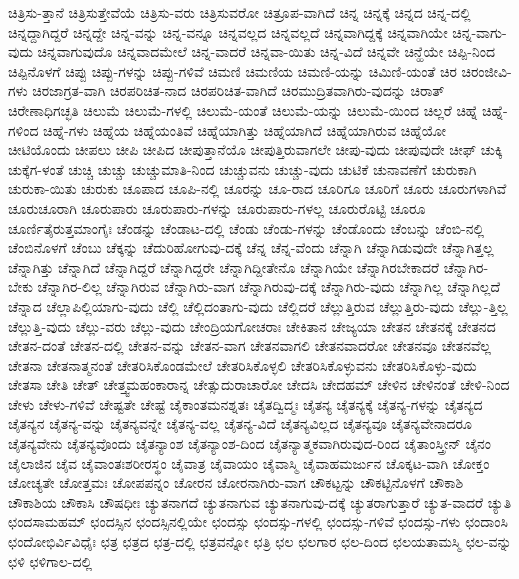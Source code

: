 {ಚಿತ್ರಿಸು-ತ್ತಾನೆ
ಚಿತ್ರಿಸುತ್ತೇವೆಯೆ
ಚಿತ್ರಿಸು-ವರು
ಚಿತ್ರಿಸುವರೋ
ಚಿತ್ರೂಪ-ವಾಗಿದೆ
ಚಿನ್ನ
ಚಿನ್ನಕ್ಕೆ
ಚಿನ್ನದ
ಚಿನ್ನ-ದಲ್ಲಿ
ಚಿನ್ನದ್ದಾಗಿದ್ದರೆ
ಚಿನ್ನದ್ದೇ
ಚಿನ್ನ-ವನ್ನು
ಚಿನ್ನ-ವನ್ನೂ
ಚಿನ್ನವಲ್ಲದ
ಚಿನ್ನವಲ್ಲದೆ
ಚಿನ್ನವಾಗಿದ್ದಕ್ಕೆ
ಚಿನ್ನವಾಗಿಯೇ
ಚಿನ್ನ-ವಾಗು-ವುದು
ಚಿನ್ನವಾಗುವುದೊ
ಚಿನ್ನವಾದಮೇಲೆ
ಚಿನ್ನ-ವಾದರೆ
ಚಿನ್ನವಾ-ಯಿತು
ಚಿನ್ನ-ವಿದೆ
ಚಿನ್ನವೇ
ಚಿನ್ಹೆಯೇ
ಚಿಪ್ಪಿ-ನಿಂದ
ಚಿಪ್ಪಿನೊಳಗೆ
ಚಿಪ್ಪು
ಚಿಪ್ಪು-ಗಳನ್ನು
ಚಿಪ್ಪು-ಗಳಿವೆ
ಚಿಮಣಿ
ಚಿಮಣಿಯ
ಚಿಮಣಿ-ಯನ್ನು
ಚಿಮಿಣಿ-ಯಂತೆ
ಚಿರ
ಚಿರಂಜೀವಿ-ಗಳು
ಚಿರಜಾಗ್ರತ-ವಾಗಿ
ಚಿರಪರಿಚಿತ-ನಾದ
ಚಿರಪರಿಚಿತ-ವಾಗಿದೆ
ಚಿರಮುದ್ರಿತವಾಗಿರು-ವುದನ್ನು
ಚಿರಾತ್
ಚಿರೇಣಾಧಿಗಚ್ಛತಿ
ಚಿಲುಮೆ
ಚಿಲುಮೆ-ಗಳಲ್ಲಿ
ಚಿಲುಮೆ-ಯಂತೆ
ಚಿಲುಮೆ-ಯನ್ನು
ಚಿಲುಮೆ-ಯಿಂದ
ಚಿಲ್ಲರೆ
ಚಿಹ್ನೆ
ಚಿಹ್ನೆ-ಗಳಿಂದ
ಚಿಹ್ನೆ-ಗಳು
ಚಿಹ್ನೆಯ
ಚಿಹ್ನೆಯಂತಿವೆ
ಚಿಹ್ನೆಯಾಗಿತ್ತು
ಚಿಹ್ನೆಯಾಗಿದೆ
ಚಿಹ್ನೆಯಾಗಿರುವ
ಚಿಹ್ನೆಯೋ
ಚೀಟಿಯೊಂದು
ಚೀಪಲು
ಚೀಪಿ
ಚೀಪಿದ
ಚೀಪುತ್ತಾನೆಯೊ
ಚೀಪುತ್ತಿರುವಾಗಲೇ
ಚೀಪು-ವುದು
ಚೀಪುವುದೇ
ಚೀಫ್
ಚುಕ್ಕಿ
ಚುಕ್ಕೆಗ-ಳಂತೆ
ಚುಚ್ಚಿ
ಚುಚ್ಚು
ಚುಚ್ಚುಮಾತಿ-ನಿಂದ
ಚುಚ್ಚುವನು
ಚುಚ್ಚು-ವುದು
ಚುಟಿಕೆ
ಚುನಾವಣೆಗೆ
ಚುರುಕಾಗಿ
ಚುರುಕಾ-ಯಿತು
ಚುರುಕು
ಚೂಪಾದ
ಚೂಪಿ-ನಲ್ಲಿ
ಚೂರನ್ನು
ಚೂ-ರಾದ
ಚೂರಿಗೂ
ಚೂರಿಗೆ
ಚೂರು
ಚೂರುಗಳಾಗಿವೆ
ಚೂರುಚೂರಾಗಿ
ಚೂರುಪಾರು
ಚೂರುಪಾರು-ಗಳನ್ನು
ಚೂರುಪಾರು-ಗಳಲ್ಲ
ಚೂರುರೊಟ್ಟಿ
ಚೂರೂ
ಚೂರ್ಣಿತೈರುತ್ತಮಾಂಗೈಃ
ಚೆಂಡನ್ನು
ಚೆಂಡಾಟ-ದಲ್ಲಿ
ಚೆಂಡು
ಚೆಂಡು-ಗಳನ್ನು
ಚೆಂಡೊಂದು
ಚೆಂಬನ್ನು
ಚೆಂಬಿ-ನಲ್ಲಿ
ಚೆಂಬಿನೊಳಗೆ
ಚೆಂಬು
ಚೆಕ್ಕನ್ನು
ಚೆದುರಿಹೋಗುವು-ದಕ್ಕೆ
ಚೆನ್ನ
ಚೆನ್ನ-ವೆಂದು
ಚೆನ್ನಾಗಿ
ಚೆನ್ನಾಗಿಡುವುದೇ
ಚೆನ್ನಾಗಿತ್ತಲ್ಲ
ಚೆನ್ನಾಗಿತ್ತು
ಚೆನ್ನಾಗಿದೆ
ಚೆನ್ನಾಗಿದ್ದರೆ
ಚೆನ್ನಾಗಿದ್ದರೇ
ಚೆನ್ನಾಗಿದ್ದೀತೇನೊ
ಚೆನ್ನಾಗಿಯೇ
ಚೆನ್ನಾಗಿರಬೇಕಾದರೆ
ಚೆನ್ನಾಗಿರ-ಬೇಕು
ಚೆನ್ನಾಗಿರ-ಲಿಲ್ಲ
ಚೆನ್ನಾಗಿರುವ
ಚೆನ್ನಾಗಿರು-ವಾಗ
ಚೆನ್ನಾಗಿರುವು-ದಕ್ಕೆ
ಚೆನ್ನಾಗಿರು-ವುದು
ಚೆನ್ನಾಗಿಲ್ಲ
ಚೆನ್ನಾಗಿಲ್ಲದೆ
ಚೆನ್ನಾದ
ಚೆಲ್ಲಾಪಿಲ್ಲಿಯಾಗು-ವುದು
ಚೆಲ್ಲಿ
ಚೆಲ್ಲಿದಂತಾಗು-ವುದು
ಚೆಲ್ಲಿದರೆ
ಚೆಲ್ಲುತ್ತಿರುವ
ಚೆಲ್ಲುತ್ತಿರು-ವುದು
ಚೆಲ್ಲು-ತ್ತಿಲ್ಲ
ಚೆಲ್ಲುತ್ತಿ-ವುದು
ಚೆಲ್ಲು-ವರು
ಚೆಲ್ಲು-ವುದು
ಚೇಂದ್ರಿಯಗೋಚರಾಃ
ಚೇಕಿತಾನ
ಚೇಜ್ಯಯಾ
ಚೇತನ
ಚೇತನಕ್ಕೆ
ಚೇತನದ
ಚೇತನ-ದಂತೆ
ಚೇತನ-ದಲ್ಲಿ
ಚೇತನ-ವನ್ನು
ಚೇತನ-ವಾಗ
ಚೇತನವಾಗಲಿ
ಚೇತನವಾದರೋ
ಚೇತನವೂ
ಚೇತನವೆಲ್ಲ
ಚೇತನಾ
ಚೇತನಾತ್ಮನಂತೆ
ಚೇತರಿಸಿಕೊಂಡಮೇಲೆ
ಚೇತರಿಸಿಕೊಳ್ಳಲಿ
ಚೇತರಿಸಿಕೊಳ್ಳುವನು
ಚೇತರಿಸಿಕೊಳ್ಳು-ವುದು
ಚೇತಸಾ
ಚೇತಿ
ಚೇತ್
ಚೇತ್ತ್ವಮಹಂಕಾರಾನ್ನ
ಚೇತ್ಸುದುರಾಚಾರೋ
ಚೇದಸಿ
ಚೇದಹಮ್
ಚೇಳಿನ
ಚೇಳಿನಂತೆ
ಚೇಳಿ-ನಿಂದ
ಚೇಳು
ಚೇಳು-ಗಳಿವೆ
ಚೇಷ್ಟತೇ
ಚೇಷ್ಟೆ
ಚೈಕಾಂತಮನಶ್ನತಃ
ಚೈತದ್ವಿದ್ಮಃ
ಚೈತನ್ಯ
ಚೈತನ್ಯಕ್ಕೆ
ಚೈತನ್ಯ-ಗಳನ್ನು
ಚೈತನ್ಯದ
ಚೈತನ್ಯನ
ಚೈತನ್ಯ-ವನ್ನು
ಚೈತನ್ಯವನ್ನೇ
ಚೈತನ್ಯ-ವಲ್ಲ
ಚೈತನ್ಯ-ವಿದೆ
ಚೈತನ್ಯವಿಲ್ಲದ
ಚೈತನ್ಯವೂ
ಚೈತನ್ಯವೇನಾದರೂ
ಚೈತನ್ಯವೇನು
ಚೈತನ್ಯವೊಂದು
ಚೈತನ್ಯಾಂಶ
ಚೈತನ್ಯಾಂಶ-ದಿಂದ
ಚೈತನ್ಯಾತ್ಮಕವಾಗಿರುವುದ-ರಿಂದ
ಚೈತಾಂಸ್ತ್ರೀನ್
ಚೈನಂ
ಚೈಲಾಜಿನ
ಚೈವ
ಚೈವಾಂತಃಶರೀರಸ್ಥಂ
ಚೈವಾತ್ರ
ಚೈವಾಯಂ
ಚೈವಾಸ್ಮಿ
ಚೈವಾಹಮರ್ಜುನ
ಚೊಕ್ಕಟ-ವಾಗಿ
ಚೋಕ್ತಂ
ಚೋಚ್ಯತೇ
ಚೋತ್ತಮಃ
ಚೋಪಪನ್ನಂ
ಚೋರನ
ಚೋರನಾಗಿರು-ವಾಗ
ಚೌಕಟ್ಟನ್ನು
ಚೌಕಟ್ಟಿನೊಳಗೆ
ಚೌಕಾಶಿ
ಚೌಕಾಶಿಯ
ಚೌಕಾಸಿ
ಚೌಷಧೀಃ
ಚ್ಯುತನಾಗದೆ
ಚ್ಯುತನಾಗುವ
ಚ್ಯುತನಾಗುವು-ದಕ್ಕೆ
ಚ್ಯುತರಾಗುತ್ತಾರೆ
ಚ್ಯುತ-ವಾದರೆ
ಚ್ಯುತಿ
ಛಂದಸಾಮಹಮ್
ಛಂದಸ್ಸಿನ
ಛಂದಸ್ಸಿನಲ್ಲಿಯೇ
ಛಂದಸ್ಸು
ಛಂದಸ್ಸು-ಗಳಲ್ಲಿ
ಛಂದಸ್ಸು-ಗಳಿವೆ
ಛಂದಸ್ಸು-ಗಳು
ಛಂದಾಂಸಿ
ಛಂದೋಭಿರ್ವಿವಿಧೈಃ
ಛತ್ರ
ಛತ್ರದ
ಛತ್ರ-ದಲ್ಲಿ
ಛತ್ರವನ್ನೋ
ಛತ್ರಿ
ಛಲ
ಛಲಗಾರ
ಛಲ-ದಿಂದ
ಛಲಯತಾಮಸ್ಮಿ
ಛಲ-ವನ್ನು
ಛಳಿ
ಛಳಿಗಾಲ-ದಲ್ಲಿ
}
